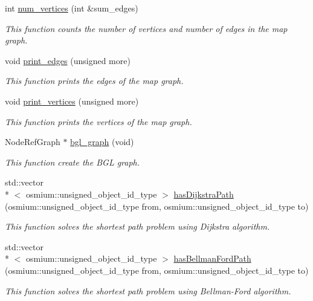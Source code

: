 \begin{DoxyCompactItemize}
\item 
int \hyperlink{classjustine_1_1sampleclient_1_1MyShmClient_a660a0217e0413f4e5f6c1bfc2be80834}{num\-\_\-vertices} (int \&sum\-\_\-edges)
\begin{DoxyCompactList}\small\item\em This function counts the number of vertices and number of edges in the map graph. \end{DoxyCompactList}\item 
void \hyperlink{classjustine_1_1sampleclient_1_1MyShmClient_ad92c09f0803a99cd3c523063b4339420}{print\-\_\-edges} (unsigned more)
\begin{DoxyCompactList}\small\item\em This function prints the edges of the map graph. \end{DoxyCompactList}\item 
void \hyperlink{classjustine_1_1sampleclient_1_1MyShmClient_ad715aff6797601f785e74bc83906e366}{print\-\_\-vertices} (unsigned more)
\begin{DoxyCompactList}\small\item\em This function prints the vertices of the map graph. \end{DoxyCompactList}\item 
Node\-Ref\-Graph $\ast$ \hyperlink{classjustine_1_1sampleclient_1_1MyShmClient_a3f164bc7db036f35477f82f5d837ac17}{bgl\-\_\-graph} (void)
\begin{DoxyCompactList}\small\item\em This function create the B\-G\-L graph. \end{DoxyCompactList}\item 
std\-::vector\\*
$<$ osmium\-::unsigned\-\_\-object\-\_\-id\-\_\-type $>$ \hyperlink{classjustine_1_1sampleclient_1_1MyShmClient_a84e9fce2ea4e84c0d54f930cbfb3b889}{has\-Dijkstra\-Path} (osmium\-::unsigned\-\_\-object\-\_\-id\-\_\-type from, osmium\-::unsigned\-\_\-object\-\_\-id\-\_\-type to)
\begin{DoxyCompactList}\small\item\em This function solves the shortest path problem using Dijkstra algorithm. \end{DoxyCompactList}\item 
std\-::vector\\*
$<$ osmium\-::unsigned\-\_\-object\-\_\-id\-\_\-type $>$ \hyperlink{classjustine_1_1sampleclient_1_1MyShmClient_a09309cb534eb586e5a9a1954e3e4c7d9}{has\-Bellman\-Ford\-Path} (osmium\-::unsigned\-\_\-object\-\_\-id\-\_\-type from, osmium\-::unsigned\-\_\-object\-\_\-id\-\_\-type to)
\begin{DoxyCompactList}\small\item\em This function solves the shortest path problem using Bellman-\/\-Ford algorithm. \end{DoxyCompactList}\end{DoxyCompactItemize}
